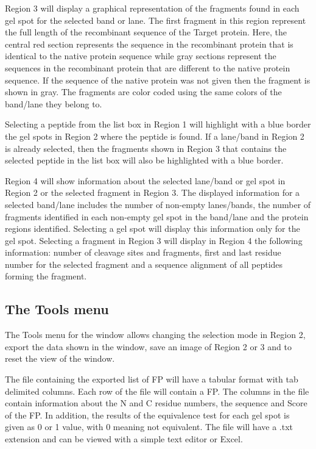 Region \num{3} will display a graphical representation of the fragments found in each gel spot for the selected band or lane. The first fragment in this region represent the full length of the recombinant sequence of the Target protein. Here, the central red section represents the sequence in the recombinant protein that is identical to the native protein sequence while gray sections represent the sequences in the recombinant protein that are different to the native protein sequence.  If the sequence of the native protein was not given then the fragment is shown in gray. The fragments are color coded using the same colors of the band/lane they belong to.

Selecting a peptide from the list box in Region \num{1} will highlight with a blue border the gel spots in Region \num{2} where the peptide is found. If a lane/band in Region \num{2} is already selected, then the fragments shown in Region \num{3} that contains the selected peptide in the list box will also be highlighted with a blue border.

Region \num{4} will show information about the selected lane/band or gel spot in Region \num{2} or the selected fragment in Region \num{3}. The displayed information for a selected band/lane includes the number of non-empty lanes/bands, the number of fragments identified in each non-empty gel spot in the band/lane and the protein regions identified. Selecting a gel spot will display this information only for the gel spot. Selecting a fragment in Region \num{3} will display in Region \num{4} the following information: number of cleavage sites and fragments, first and last residue number for the selected fragment and a sequence alignment of all peptides forming the fragment.  

\subsection{The Tools menu}
\label{subsec:limprotToolsMenu}

The Tools menu for the window allows changing the selection mode in Region \num{2}, export the data shown in the window, save an image of Region \num{2} or \num{3} and to reset the view of the window.

The file containing the exported list of FP will have a tabular format with tab delimited columns. Each row of the file will contain a FP. The columns in the file contain information about the N and C residue numbers, the sequence and Score of the FP. In addition, the results of the equivalence test for each gel spot is given as 0 or 1 value, with 0 meaning not equivalent. The file will have a .txt extension and can be viewed with a simple text editor or Excel.
